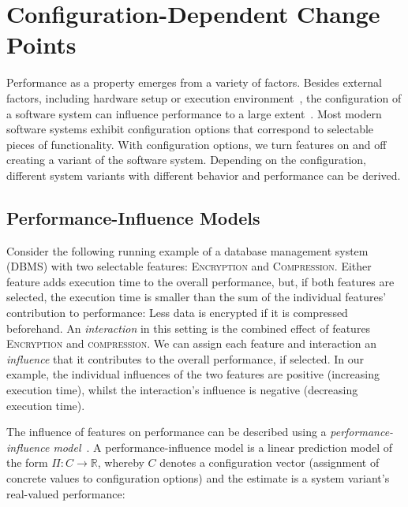 \documentclass[sigconf, screen]{acmart}
\begin{document}
	\section{Configuration-Dependent Change Points}
	Performance as a property emerges from a variety of factors.
	Besides external factors, including hardware setup or execution environment~\cite{ousterhout_always_2018}, the configuration  of a software system can influence performance to a large extent~\cite{siegmundPredictingPerformanceAutomated2012}.
	Most modern software systems exhibit configuration options that correspond to selectable pieces of functionality.
	With configuration options, we turn features on and off creating a variant of the software system.
	Depending on the configuration, different system variants with different behavior and performance can be derived.
	
	\subsection{Performance-Influence Models}\label{sec:pimodels}
	Consider the following running example of a database management system (DBMS) with two selectable features: \textsc{Encryption} and \textsc{Compression}.
	Either feature adds execution time to the overall performance, but, if both features are selected, the execution time is smaller than the sum of the individual features' contribution to performance: Less data is encrypted if it is compressed beforehand.
	An \textit{interaction} in this setting is the combined effect of features \textsc{Encryption} and \textsc{compression}.
	We can assign each feature and interaction an \textit{influence} that it contributes to the overall performance, if selected. In our example, the individual influences of the two features are positive (increasing execution time), whilst the interaction's influence is negative (decreasing execution time).
	
	The influence of features on performance can be described using a \emph{performance-influence model}~\cite{siegmundPerformanceinfluenceModelsHighly2015}.
	A performance-influence model is a linear prediction model of the form $\Pi:C\rightarrow \mathbb{R}$, whereby $C$ denotes a configuration vector (assignment of concrete values to configuration options) and the estimate is a system variant's real-valued performance:
	
\end{document}
